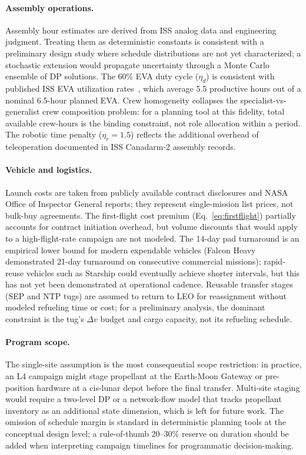 \paragraph{Assembly operations.}
Assembly hour estimates are derived from ISS analog data and
engineering judgment. Treating them as deterministic constants
is consistent with a preliminary design study where schedule
distributions are not yet characterized; a stochastic extension
would propagate uncertainty through a Monte Carlo ensemble of
DP solutions. The 60\% EVA duty cycle ($\eta_d$) is consistent
with published ISS EVA utilization rates~\cite{mcdonnell_iss_eva},
which average 5.5 productive hours out of a nominal 6.5-hour
planned EVA. Crew homogeneity collapses the specialist-vs-generalist
crew composition problem: for a planning tool at this fidelity,
total available crew-hours is the binding constraint, not role
allocation within a period. The robotic time penalty ($\eta_r =
1.5$) reflects the additional overhead of teleoperation documented
in ISS Canadarm-2 assembly records.

\paragraph{Vehicle and logistics.}
Launch costs are taken from publicly available contract disclosures
and NASA Office of Inspector General reports; they represent
single-mission list prices, not bulk-buy agreements. The first-flight
cost premium (Eq.~\ref{eq:firstflight}) partially accounts for
contract initiation overhead, but volume discounts that would
apply to a high-flight-rate campaign are not modeled. The 14-day
pad turnaround is an empirical lower bound for modern expendable
vehicles (Falcon Heavy demonstrated 21-day turnaround on consecutive
commercial missions); rapid-reuse vehicles such as Starship could
eventually achieve shorter intervals, but this has not yet been
demonstrated at operational cadence. Reusable transfer stages (SEP
and NTP tugs) are assumed to return to LEO for reassignment without
modeled refueling time or cost; for a preliminary analysis, the
dominant constraint is the tug's $\Delta v$ budget and cargo
capacity, not its refueling schedule.

\paragraph{Program scope.}
The single-site assumption is the most consequential scope
restriction: in practice, an L4 campaign might stage propellant
at the Earth-Moon Gateway or pre-position hardware at a
cis-lunar depot before the final transfer. Multi-site staging
would require a two-level DP or a network-flow model that tracks
propellant inventory as an additional state dimension, which
is left for future work. The omission of schedule margin is
standard in deterministic planning tools at the conceptual design
level; a rule-of-thumb 20--30\% reserve on duration should be
added when interpreting campaign timelines for programmatic
decision-making.

